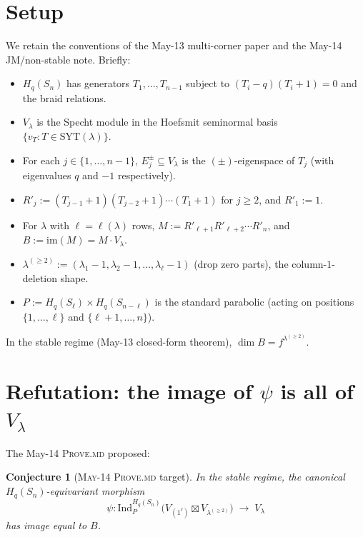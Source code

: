 \documentclass[11pt]{article}
\newtheorem{conjecture}[theorem]{Conjecture}
\theoremstyle{definition}
\begin{document}
\section{Setup}\label{sec:setup}

We retain the conventions of the May-13 multi-corner paper and the
May-14 JM/non-stable note. Briefly:
\begin{itemize}[topsep=0.2em,itemsep=0.1em,leftmargin=2em]
\item $H_q(S_n)$ has generators $T_1, \ldots, T_{n-1}$ subject to
  $(T_i - q)(T_i + 1) = 0$ and the braid relations.
\item $V_\lambda$ is the Specht module in the Hoefsmit seminormal
  basis $\{v_T : T \in \mathrm{SYT}(\lambda)\}$.
\item For each $j \in \{1, \ldots, n-1\}$, $E_j^\pm \subseteq V_\lambda$
  is the $(\pm)$-eigenspace of $T_j$ (with eigenvalues $q$ and $-1$
  respectively).
\item $R'_j := (T_{j-1}+1)(T_{j-2}+1)\cdots(T_1+1)$ for $j \ge 2$,
  and $R'_1 := 1$.
\item For $\lambda$ with $\ell = \ell(\lambda)$ rows,
  $M := R'_{\ell+1} R'_{\ell+2} \cdots R'_n$, and
  $B := \mathrm{im}(M) = M \cdot V_\lambda$.
\item $\lambda^{(\ge 2)} := (\lambda_1 - 1, \lambda_2 - 1, \ldots,
  \lambda_\ell - 1)$ (drop zero parts), the column-$1$-deletion shape.
\item $P := H_q(S_\ell) \times H_q(S_{n-\ell})$ is the standard
  parabolic (acting on positions $\{1, \ldots, \ell\}$ and
  $\{\ell+1, \ldots, n\}$).
\end{itemize}

In the stable regime (May-13 closed-form theorem),
$\dim B = f^{\lambda^{(\ge 2)}}$.

\section{Refutation: the image of $\psi$ is all of $V_\lambda$}
\label{sec:refute-im}

The May-14 \textsc{Prove.md} proposed:
\begin{conjecture}[\textsc{May-14 Prove.md} target]\label{conj:prove}
In the stable regime, the canonical $H_q(S_n)$-equivariant morphism
\[
   \psi : \mathrm{Ind}_P^{H_q(S_n)}\!\bigl( V_{(1^\ell)}
        \boxtimes V_{\lambda^{(\ge 2)}} \bigr) \;\longrightarrow\; V_\lambda
\]
has image equal to $B$.
\end{conjecture}
\end{document}
